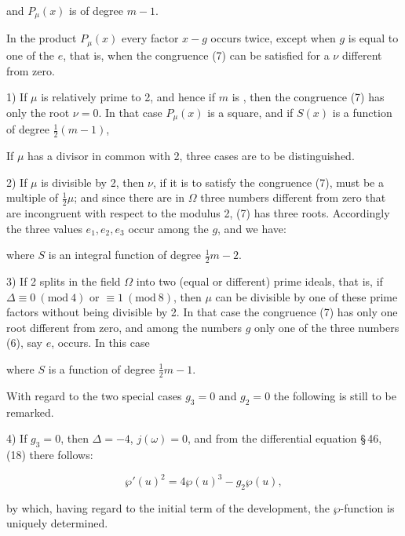 

and $P_\mu(x)$ is of degree $m - 1$.

In the product $P_\mu(x)$ every factor $x - g$ occurs twice, except when $g$ is equal to one of the $e$, that is, when the congruence (7) can be satisfied for a $\nu$ different from zero.

1) If $\mu$ is relatively prime to 2, and hence if $m$ is , then the congruence (7) has only the root $\nu = 0$. In that case $P_\mu(x)$ is a square, and if $S(x)$ is a function of degree $\frac{1}{2}(m - 1)$,


If $\mu$ has a divisor in common with 2, three cases are to be distinguished.

2) If $\mu$ is divisible by 2, then $\nu$, if it is to satisfy the congruence (7), must be a multiple of $\frac{1}{2}\mu$; and since there are in $\Omega$ three numbers different from zero that are incongruent with respect to the modulus 2, (7) has three roots. Accordingly the three values $e_1, e_2, e_3$ occur among the $g$, and we have:


where $S$ is an integral function of degree $\frac{1}{2}m - 2$.

3) If 2 splits in the field $\Omega$ into two (equal or different) prime ideals, that is, if $\Delta \equiv 0 \ (\mathrm{mod}\ 4)$ or $\equiv 1 \ (\mathrm{mod}\ 8)$, then $\mu$ can be divisible by one of these prime factors without being divisible by 2. In that case the congruence (7) has only one root different from zero, and among the numbers $g$ only one of the three numbers (6), say $e$, occurs. In this case


where $S$ is a function of degree $\frac{1}{2}m - 1$.

With regard to the two special cases $g_3 = 0$ and $g_2 = 0$ the following is still to be remarked.

4) If $g_3 = 0$, then $\Delta = -4$, $j(\omega) = 0$, and from the differential equation §\,46, (18) there follows:

\[
\wp'(u)^2 = 4\wp(u)^3 - g_2 \wp(u),
\]

by which, having regard to the initial term of the development, the $\wp$-function is uniquely determined.
